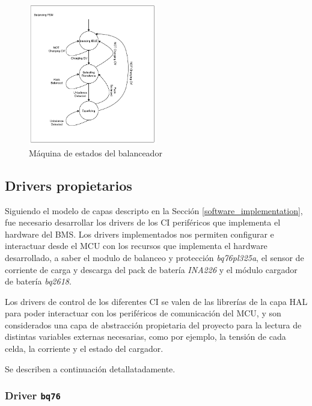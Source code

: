 \documentclass[10pt, a4paper]{report}
\begin{document}
\FloatBarrier
\begin{figure}[h!]
	\begin{center}
		\includegraphics[width=0.5\textwidth]{Equalizing_FSM.pdf}
		\caption{Máquina de estados del balanceador} 
		\label{fig::Equalizing_FSM}
	\end{center}
\end{figure}
\FloatBarrier

\subsection{Drivers propietarios}

Siguiendo el modelo de capas descripto en la Sección 
\ref{software_implementation}, fue necesario desarrollar los drivers de los
\acrshort{CI} periféricos que implementa el hardware del \acrshort{BMS}. Los
drivers implementados nos permiten configurar e interactuar desde el
\acrshort{MCU} con los recursos que implementa el hardware desarrollado, a saber
el modulo de balanceo y protección \emph{bq76pl325a}, el sensor de corriente de
carga y descarga del pack de batería \emph{INA226} y el módulo cargador de
batería \emph{bq2618}.

Los drivers de control de los diferentes \acrshort{CI} se valen de las librerías 
de la capa \acrshort{HAL} para poder interactuar con los periféricos de
comunicación del \acrshort{MCU}, y son considerados una capa de abstracci\'on
propietaria del proyecto para la lectura de distintas variables externas
necesarias, como por ejemplo, la tensi\'on de cada celda, la corriente y el
estado del cargador.

Se describen a continuación detallatadamente.

\subsubsection{Driver \texttt{bq76}}\label{bq76_driver}
\end{document}
